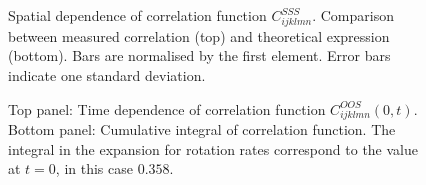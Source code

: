 \documentclass[thesis.tex]{subfiles}
\begin{document}
\begin{figure}
	\begin{center}
\end{center}
\caption{ Spatial dependence of correlation function $C^{SSS}_{ijklmn}$. Comparison between measured correlation (top) and theoretical expression  (bottom). Bars are normalised by the first element. Error bars indicate one standard deviation.}%
\end{figure}

\begin{figure}
	\begin{center}
\end{center}
\caption{ Top panel: Time dependence of correlation function $C^{OOS}_{ijklmn}(0,t)$. Bottom panel: Cumulative integral of correlation function. The integral in the expansion for rotation rates  correspond to the value at $t=0$, in this case $0.358$.}%
\end{figure}
\end{document}
